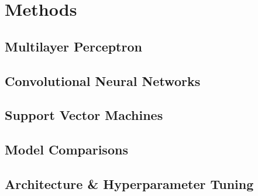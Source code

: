 \documentclass[../main.tex]{subfiles}
\begin{document}
\section{Methods}
\noindent  

\subsection{Multilayer Perceptron}
\subsection{Convolutional Neural Networks}
\subsection{Support Vector Machines}

\subsection{Model Comparisons}

\subsection{Architecture \& Hyperparameter Tuning}
\end{document}
